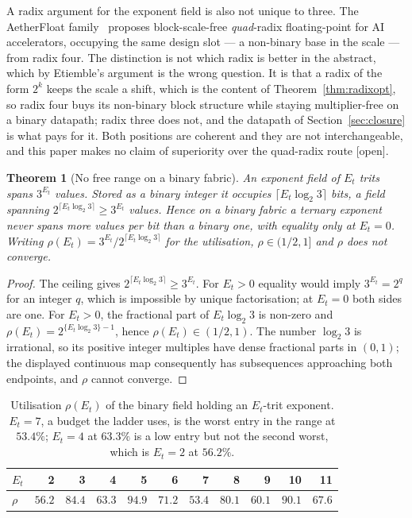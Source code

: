 \documentclass[11pt]{article}
\newtheorem{theorem}{Theorem}
\theoremstyle{definition}
\begin{document}
A radix argument for the exponent field is also not unique to three. The
AetherFloat family~\cite{aetherfloat} proposes block-scale-free \emph{quad}-radix
floating-point for AI accelerators, occupying the same design slot --- a
non-binary base in the scale --- from radix four. The distinction is not which
radix is better in the abstract, which by Etiemble's argument is the wrong
question. It is that a radix of the form $2^{k}$ keeps the scale a shift, which is
the content of Theorem~\ref{thm:radixopt}, so radix four buys its non-binary block
structure while staying multiplier-free on a binary datapath; radix three does
not, and the datapath of Section~\ref{sec:closure} is what pays for it. Both
positions are coherent and they are not interchangeable, and this paper makes no
claim of superiority over the quad-radix route [open].

\begin{theorem}[No free range on a binary fabric]
\label{thm:nofree}
An exponent field of $E_t$ trits spans $3^{E_t}$ values. Stored as a binary
integer it occupies $\lceil E_t\log_2 3\rceil$ bits, a field spanning
$2^{\lceil E_t\log_2 3\rceil} \geq 3^{E_t}$ values. Hence on a binary fabric a
ternary exponent never spans more values per bit than a binary one, with equality
only at $E_t = 0$. Writing $\rho(E_t) = 3^{E_t}/2^{\lceil E_t\log_2 3\rceil}$ for
the utilisation, $\rho \in (1/2, 1]$ and $\rho$ does not converge.
\end{theorem}
\begin{proof}
The ceiling gives $2^{\lceil E_t\log_2 3\rceil}\geq3^{E_t}$.  For
$E_t>0$ equality would imply $3^{E_t}=2^q$ for an integer $q$, which is
impossible by unique factorisation; at $E_t=0$ both sides are one.  For
$E_t>0$, the fractional part of $E_t\log_2 3$ is non-zero and
$\rho(E_t)=2^{\{E_t\log_2 3\}-1}$, hence $\rho(E_t)\in(1/2,1)$.  The number
$\log_2 3$ is irrational, so its positive integer multiples have dense
fractional parts in $(0,1)$; the displayed continuous map consequently has
subsequences approaching both endpoints, and $\rho$ cannot converge.
\end{proof}

\begin{table}[t]\centering
\caption{Utilisation $\rho(E_t)$ of the binary field holding an $E_t$-trit
exponent. $E_t = 7$, a budget the ladder uses, is the worst entry in the range at
$53.4\%$; $E_t = 4$ at $63.3\%$ is a low entry but not the second worst, which is
$E_t = 2$ at $56.2\%$.}
\label{tab:rho}
\begin{tabular}{lrrrrrrrrrr}
\toprule
$E_t$ & 2 & 3 & 4 & 5 & 6 & 7 & 8 & 9 & 10 & 11 \\
\midrule
$\rho$ & $56.2$ & $84.4$ & $\mathbf{63.3}$ & $94.9$ & $71.2$ & $\mathbf{53.4}$ & $80.1$ & $60.1$ & $90.1$ & $67.6$ \\
\bottomrule
\end{tabular}
\end{table}
\end{document}
